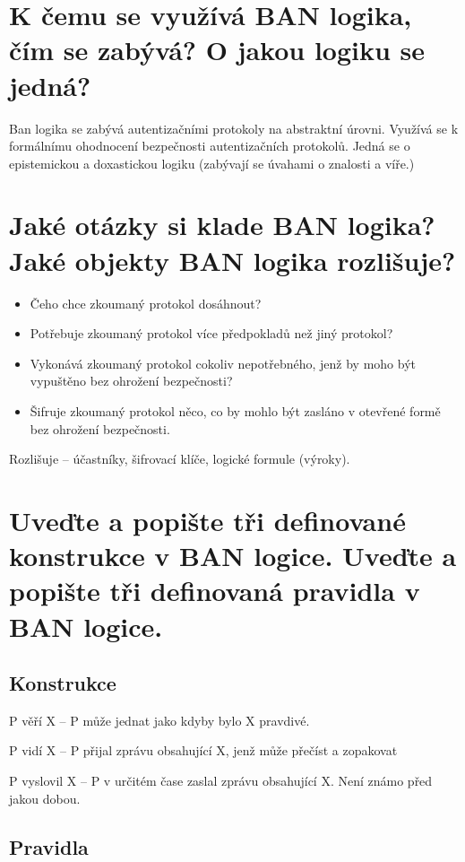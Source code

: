 \section{K čemu se využívá BAN logika, čím se zabývá? O jakou logiku se jedná?}

Ban logika se zabývá autentizačními protokoly na abstraktní úrovni. Využívá se k formálnímu ohodnocení bezpečnosti autentizačních protokolů. Jedná se o epistemickou a doxastickou logiku (zabývají se úvahami o znalosti a víře.) 

\section{Jaké otázky si klade BAN logika? Jaké objekty BAN logika rozlišuje?}

\begin{itemize}
    \item Čeho chce zkoumaný protokol dosáhnout?
    \item Potřebuje zkoumaný protokol více předpokladů než jiný protokol?
    \item Vykonává zkoumaný protokol cokoliv nepotřebného, jenž by moho být vypuštěno bez ohrožení bezpečnosti?
    \item Šifruje zkoumaný protokol něco, co by mohlo být zasláno v otevřené formě bez ohrožení bezpečnosti.
\end{itemize}

Rozlišuje -- účastníky, šifrovací klíče, logické formule (výroky).

\section{Uveďte a popište tři definované konstrukce v BAN logice. Uveďte a popište tři definovaná pravidla v BAN logice.}

\subsection{Konstrukce}

P věří X -- P může jednat jako kdyby bylo X pravdivé.

P vidí X -- P přijal zprávu obsahující X, jenž může přečíst a zopakovat

P vyslovil X -- P v určitém čase zaslal zprávu obsahující X. Není známo před jakou dobou.

\subsection{Pravidla}

